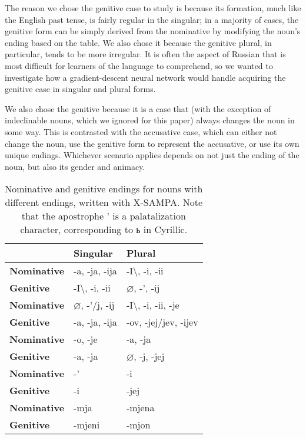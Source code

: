 \documentclass[11pt,a4paper]{article}
\begin{document}
The reason we chose the genitive case to study is because its formation,
much like the English past tense, is fairly regular in the singular; in a majority of cases,
the genitive form can be simply derived from the nominative by modifying the
noun's ending based on the table. We also chose it because the genitive plural,
in particular, tends to be more irregular. It is often the aspect of Russian
that is most difficult for learners of the language to comprehend, so
we wanted to investigate how a gradient-descent neural network would handle
acquiring the genitive case in singular and plural forms.

We also chose the genitive because it is a case that (with the exception of
indeclinable nouns, which we ignored for this paper) always changes the noun
in some way. This is contrasted with the accusative case, which can either
not change the noun, use the genitive form to represent the accusative, or 
use its own unique endings. Whichever scenario applies depends on not just 
the ending of the noun, but also its gender and animacy.

\begin{table}[t!]
\begin{center}
\begin{tabular}{|l|l|l}
\hline & \textbf{Singular} & \textbf{Plural} \\ \hline
\textbf{Nominative} & -a, -ja, -ija & -I\textbackslash, -i, -ii \\
\textbf{Genitive} & -I\textbackslash, -i, -ii & $\varnothing$, -', -ij \\ \hline
\textbf{Nominative} & $\varnothing$, -'/j, -ij & -I\textbackslash, -i, -ii, -je \\
\textbf{Genitive} & -a, -ja, -ija & -ov, -jej/jev, -ijev \\ \hline
\textbf{Nominative} & -o, -je & -a, -ja \\
\textbf{Genitive} & -a, -ja & $\varnothing$, -j, -jej \\ \hline
\textbf{Nominative} & -' & -i \\
\textbf{Genitive} & -i & -jej \\ \hline
\textbf{Nominative} & -mja & -mjena \\
\textbf{Genitive} & -mjeni & -mjon \\ \hline
\end{tabular}
\end{center}
\caption{\label{declension} Nominative and genitive endings for nouns with different endings, written with X-SAMPA. Note that the apostrophe ' is a palatalization character, corresponding to \foreignlanguage{russian}{ь} in Cyrillic. }
\end{table}
\end{document}
